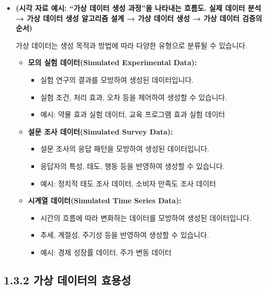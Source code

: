 \documentclass[
  letterpaper,
]{book}
\providecommand{\tightlist}{%
  \setlength{\itemsep}{0pt}\setlength{\parskip}{0pt}}
\begin{document}
\begin{itemize}
\item
  \textbf{(시각 자료 예시: ``가상 데이터 생성 과정''을 나타내는 흐름도.
  실제 데이터 분석 → 가상 데이터 생성 알고리즘 설계 → 가상 데이터 생성 →
  가상 데이터 검증의 순서)}

  가상 데이터는 생성 목적과 방법에 따라 다양한 유형으로 분류될 수
  있습니다.

  \begin{itemize}
  \tightlist
  \item
    \textbf{모의 실험 데이터(Simulated Experimental Data):}

    \begin{itemize}
    \tightlist
    \item
      실험 연구의 결과를 모방하여 생성된 데이터입니다.
    \item
      실험 조건, 처리 효과, 오차 등을 제어하여 생성할 수 있습니다.
    \item
      예시: 약물 효과 실험 데이터, 교육 프로그램 효과 실험 데이터
    \end{itemize}
  \item
    \textbf{설문 조사 데이터(Simulated Survey Data):}

    \begin{itemize}
    \tightlist
    \item
      설문 조사의 응답 패턴을 모방하여 생성된 데이터입니다.
    \item
      응답자의 특성, 태도, 행동 등을 반영하여 생성할 수 있습니다.
    \item
      예시: 정치적 태도 조사 데이터, 소비자 만족도 조사 데이터
    \end{itemize}
  \item
    \textbf{시계열 데이터(Simulated Time Series Data):}

    \begin{itemize}
    \tightlist
    \item
      시간의 흐름에 따라 변화하는 데이터를 모방하여 생성된 데이터입니다.
    \item
      추세, 계절성, 주기성 등을 반영하여 생성할 수 있습니다.
    \item
      예시: 경제 성장률 데이터, 주가 변동 데이터
    \end{itemize}
  \end{itemize}
\end{itemize}

\subsection{1.3.2 가상 데이터의
효용성}\label{uxac00uxc0c1-uxb370uxc774uxd130uxc758-uxd6a8uxc6a9uxc131}
\end{document}
